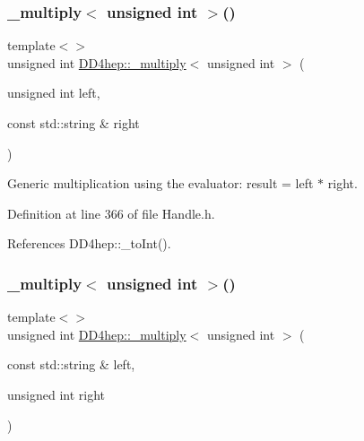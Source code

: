\subsubsection{\texorpdfstring{\+\_\+multiply$<$ unsigned int $>$()}{\_multiply< unsigned int >()}\hspace{0.1cm}{\footnotesize\ttfamily [2/3]}}
{\footnotesize\ttfamily template$<$$>$ \\
unsigned int \hyperlink{group___d_d4_h_e_p___g_e_o_m_e_t_r_y_gab860c2299e2eb50e537c5079fb0c9c51}{D\+D4hep\+::\+\_\+multiply}$<$ unsigned int $>$ (\begin{DoxyParamCaption}\item[{unsigned int}]{left,  }\item[{const std\+::string \&}]{right }\end{DoxyParamCaption})\hspace{0.3cm}{\ttfamily [inline]}}



Generic multiplication using the evaluator\+: result = left $\ast$ right. 



Definition at line 366 of file Handle.\+h.



References D\+D4hep\+::\+\_\+to\+Int().

\hypertarget{group___d_d4_h_e_p___g_e_o_m_e_t_r_y_ga0f69e380254943f59b1e3830a3437b4d}{}\label{group___d_d4_h_e_p___g_e_o_m_e_t_r_y_ga0f69e380254943f59b1e3830a3437b4d} 
\subsubsection{\texorpdfstring{\+\_\+multiply$<$ unsigned int $>$()}{\_multiply< unsigned int >()}\hspace{0.1cm}{\footnotesize\ttfamily [3/3]}}
{\footnotesize\ttfamily template$<$$>$ \\
unsigned int \hyperlink{group___d_d4_h_e_p___g_e_o_m_e_t_r_y_gab860c2299e2eb50e537c5079fb0c9c51}{D\+D4hep\+::\+\_\+multiply}$<$ unsigned int $>$ (\begin{DoxyParamCaption}\item[{const std\+::string \&}]{left,  }\item[{unsigned int}]{right }\end{DoxyParamCaption})\hspace{0.3cm}{\ttfamily [inline]}}



